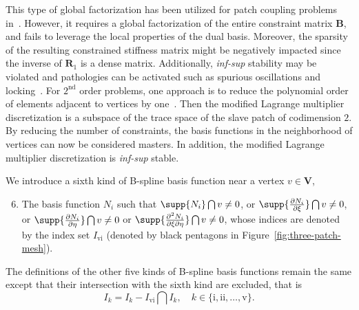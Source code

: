 This type of global factorization has been utilized for patch coupling problems in~\cite{coox_robust_2017, coox2017flexible, dornisch2017dual}. However, it requires a global factorization of the entire constraint matrix $\mathbf{B}$, and fails to leverage the local properties of the dual basis. Moreover, the sparsity of the resulting constrained stiffness matrix might be negatively impacted since the inverse of $\mathbf{R}_1$ is a dense matrix. Additionally, \textit{inf-sup} stability may be violated and pathologies can be activated such as spurious oscillations and locking~\cite{barbosa1991finite}. For $2^\text{nd}$ order problems, one approach is to reduce the polynomial order of elements adjacent to vertices by one~\cite{bernardi_domain_1993,bernardi_basics_2005,belgacem_mortar_1998,brivadis_isogeometric_2015}. Then the modified Lagrange multiplier discretization is a subspace of the trace space of the slave patch of codimension $2$. By reducing the number of constraints, the basis functions in the neighborhood of vertices can now be considered masters. In addition, the modified Lagrange multiplier discretization is \textit{inf-sup} stable.\par

We introduce a sixth kind of B-spline basis function near a vertex $v\in \mathbf{V}$,
\begin{enumerate}
  \setcounter{enumi}{5}
  \item The basis function $N_i$ such that $\supp{N_i}\bigcap{v}\neq{}0$, or $\supp{\frac{\partial{}N_i}{\partial\xi}}\bigcap{v}\neq{}0$,  or $\supp{\frac{\partial{}N_i}{\partial\eta}}\bigcap{v}\neq{}0$ or $\supp{\frac{\partial^2{}N_i}{\partial\xi\partial\eta}}\bigcap{v}\neq{}0$, whose indices are denoted by the index set $I_\text{vi}$ (denoted by black pentagons in Figure~\ref{fig:three-patch-mesh}).
\end{enumerate}
The definitions of the other five kinds of B-spline basis functions remain the same except that their intersection with the sixth kind are excluded, that is
\begin{equation}
  I_k=I_k-I_\text{vi}\bigcap{}I_k, \quad k\in\{\text{i},\text{ii},\dots,\text{v}\}.
\end{equation}

